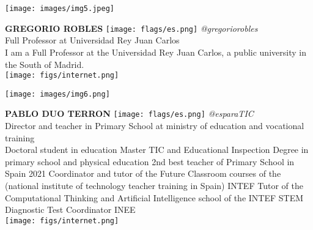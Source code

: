 \noindent
\begin{minipage}{0.3\textwidth}
\centering
\texttt{[image: images/img5.jpeg]}
\end{minipage}
\hfill
\begin{minipage}{0.6\textwidth}\raggedright
\color{color1}\uppercase{\textbf{Gregorio Robles}}
\color{color2}\hspace{0.2cm}\texttt{[image: flags/es.png]}
\hspace{0.2cm}\textit{@gregoriorobles}
\\
Full Professor at Universidad Rey Juan Carlos\\
{\footnotesize I am a Full Professor at the Universidad Rey Juan Carlos, a public university in the South of Madrid.}\\
\texttt{[image: figs/internet.png]}
\end{minipage}
\newline\newline\newline

\noindent
\begin{minipage}{0.3\textwidth}
\centering
\texttt{[image: images/img6.png]}
\end{minipage}
\hfill
\begin{minipage}{0.6\textwidth}\raggedright
\color{color1}\uppercase{\textbf{Pablo Duo Terron}}
\color{color2}\hspace{0.2cm}\texttt{[image: flags/es.png]}
\hspace{0.2cm}\textit{@esparaTIC}
\\
Director and teacher  in Primary School at ministry of education and vocational training\\
{\footnotesize Doctoral student in education 
Master TIC and Educational Inspection 
Degree in primary school and physical education  
2nd best teacher of Primary School in Spain 2021
Coordinator and tutor of the Future Classroom courses of the (national institute of technology teacher training in Spain) INTEF
Tutor of the Computational Thinking and Artificial Intelligence school of the INTEF
STEM Diagnostic Test Coordinator INEE}\\
\texttt{[image: figs/internet.png]}
\end{minipage}
\newline\newline\newline

